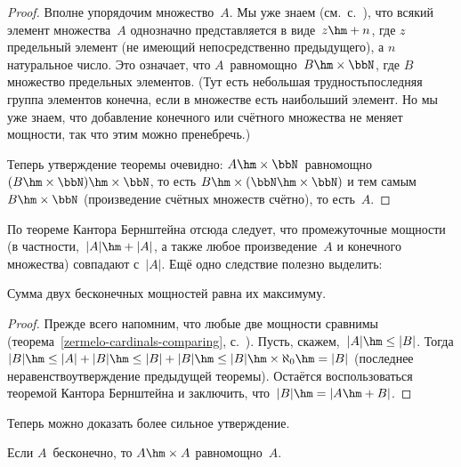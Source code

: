 \begin{proof}
Вполне упорядочим множество~$A$. Мы уже знаем
(см.~с.~\pageref{limit-natural}), что всякий элемент множества~$A$
однозначно представляется в виде~$z\hm+n$, где $z$\т предельный
элемент (не имеющий непосредственно предыдущего), а $n$\т
натуральное число. Это означает, что $A$~равномощно~$B\hm\times\bbN$,
где $B$\т множество предельных элементов. (Тут есть небольшая
трудность\т последняя группа элементов
конечна, если в множестве есть наибольший элемент. Но мы уже знаем,
что добавление конечного или счётного множества не меняет
мощности, так что этим можно пренебречь.)

Теперь утверждение теоремы
очевидно: $A\hm\times\bbN$~равномощно
$(B\hm\times\bbN)\hm\times\bbN$, то есть
$B\hm\times(\bbN\hm\times\bbN)$ и тем самым
$B\hm\times\bbN$ (произведение счётных множеств
счётно), то есть~$A$.
\end{proof}

По теореме Кантора\ч
Бернштейна
отсюда следует, что
промежуточные мощности (в частности,~$|A|\hm+|A|$, а также любое
произведение~$A$ и конечного
множества) совпадают с~$|A|$. Ещё одно следствие полезно
выделить:

\begin{theorem}
        \label{adding-cardinals}
Сумма двух бесконечных
мощностей равна их максимуму.
\end{theorem}

\begin{proof}
Прежде всего напомним, что любые две мощности сравнимы
(теорема~\ref{zermelo-cardinals-comparing},
с.~\pageref{zermelo-cardinals-comparing}). Пусть, скажем,~$|A|\hm\le |B|$.
Тогда $|B|\hm\le |A|+|B| \hm\le |B|+|B| \hm\le
|B|\hm\times\aleph_0 \hm= |B|$ (последнее неравенство\т утверждение
предыдущей теоремы). Остаётся воспользоваться теоремой Кантора\ч
Бернштейна и заключить, что~$|B|\hm=|A\hm+B|$.
\end{proof}

Теперь можно  доказать более сильное утверждение.

\begin{theorem}
        \label{cardinal-squared}%
Если $A$~бесконечно, то $A\hm\times A$ равномощно~$A$.
\end{theorem}

